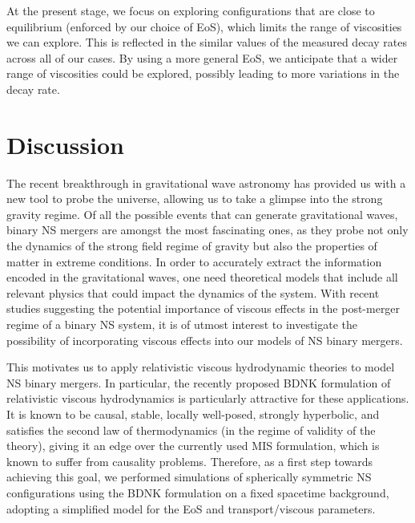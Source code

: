 \documentclass[prd,aps,twocolumn,floats,floatfix,nofootinbib,superscriptaddress] {revtex4-1}
\begin{document}
At the present stage, we focus on exploring configurations that are close to equilibrium (enforced by our choice of EoS), which limits the range of viscosities we can explore.  This is reflected in the similar values of the measured decay rates across all of our cases.  By using a more general EoS, we anticipate that a wider range of viscosities could be explored, possibly leading to more variations in the decay rate.

\section{Discussion}
The recent breakthrough in gravitational wave astronomy has provided us with a new tool to probe the universe, allowing us to take a glimpse into the strong gravity regime.  Of all the possible events that can generate gravitational waves, binary NS mergers are amongst the most fascinating ones, as they probe not only the dynamics of the strong field regime of gravity but also the properties of matter in extreme conditions.  In order to accurately extract the information encoded in the gravitational waves, one need theoretical models that include all relevant physics that could impact the dynamics of the system.  With recent studies suggesting the potential importance of viscous effects in the post-merger regime of a binary NS system, it is of utmost interest to investigate the possibility of incorporating viscous effects into our models of NS binary mergers.

This motivates us to apply relativistic viscous hydrodynamic theories to model NS binary mergers.  In particular, the recently proposed BDNK formulation of relativistic viscous hydrodynamics is particularly attractive for these applications.  It is known to be causal, stable, locally well-posed, strongly hyperbolic, and satisfies the second law of thermodynamics (in the regime of validity of the theory), giving it an edge over the currently used MIS formulation,  which is known to suffer from causality problems.  Therefore, as a first step towards achieving this goal, we performed simulations of spherically symmetric NS configurations using the BDNK formulation on a fixed spacetime background, adopting a simplified model for the EoS and transport/viscous parameters.
\end{document}

